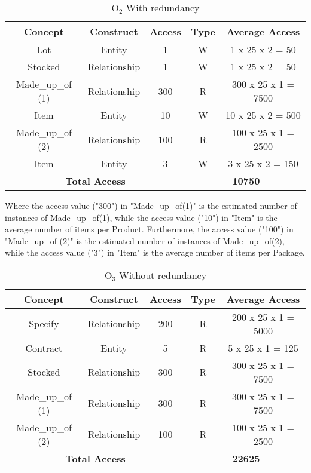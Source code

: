 \newpage
\begin{table}[!h]\caption{	$ \textrm{O}_\textrm{2} $ With redundancy}
	\begin{center}
		\begin{tabular}{| c | c | c | c | c |}
			\hline
			\textbf{Concept} & \textbf{Construct} & \textbf{Access} & \textbf{Type} & \textbf{Average Access} \\ \hline
			Lot & Entity & 1 & W & 1 x 25 x 2 = 50 \\ \hline
			Stocked & Relationship & 1 & W & 1 x 25 x 2 = 50 \\ \hline
			Made\_up\_of (1) & Relationship & 300 & R & 300 x 25 x 1 = 7500 \\ \hline
			Item & Entity & 10 & W & 10 x 25 x 2 = 500 \\ \hline
			Made\_up\_of (2) & Relationship & 100 & R & 100 x 25 x 1 = 2500 \\ \hline
			Item & Entity & 3 & W & 3 x 25 x 2 = 150 \\ \hline
			\multicolumn{3}{|c|}{\textbf{Total Access}} & \multicolumn{2}{|c|}{\textbf{10750}} \\ \hline
		\end{tabular}
	\end{center}
\end{table}

Where the access value ("300") in "Made\_up\_of(1)" is the estimated number of instances of Made\_up\_of(1), while the access value ("10") in "Item" is the average number of items per Product. Furthermore, the access value ("100") in "Made\_up\_of (2)" is the estimated number of instances of Made\_up\_of(2), while the access value ("3") in "Item" is the average number of items per Package.

\begin{table}[!h]\caption{	$ \textrm{O}_\textrm{3} $ Without redundancy }
	\begin{center}
		\begin{tabular}{| c | c | c | c | c |}
			\hline
			\textbf{Concept} & \textbf{Construct} & \textbf{Access} & \textbf{Type} & \textbf{Average Access} \\ \hline
			Specify & Relationship & 200 & R & 200 x 25 x 1 = 5000 \\ \hline
			Contract & Entity & 5 & R & 5 x 25 x 1 = 125 \\ \hline
			Stocked & Relationship & 300 & R & 300 x 25 x 1 = 7500 \\ \hline
            Made\_up\_of (1) & Relationship & 300 & R & 300 x 25 x 1 = 7500 \\ \hline
            Made\_up\_of (2) & Relationship & 100 & R & 100 x 25 x 1 = 2500 \\ \hline
			\multicolumn{3}{|c|}{\textbf{Total Access}} & \multicolumn{2}{|c|}{\textbf{22625}} \\ \hline
		\end{tabular}
	\end{center}
\end{table}

